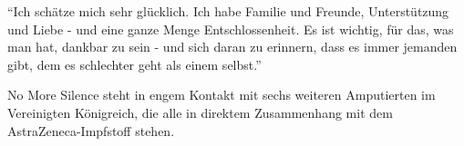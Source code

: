 {``Ich schätze mich sehr glücklich. Ich habe Familie und Freunde, Unterstützung
und Liebe - und eine ganze Menge Entschlossenheit. Es ist wichtig, für das, was
man hat, dankbar zu sein - und sich daran zu erinnern, dass es immer jemanden
gibt, dem es schlechter geht als einem selbst.''

No More Silence steht in engem Kontakt mit sechs weiteren Amputierten im
Vereinigten Königreich, die alle in direktem Zusammenhang mit dem
AstraZeneca-Impfstoff stehen.

}
